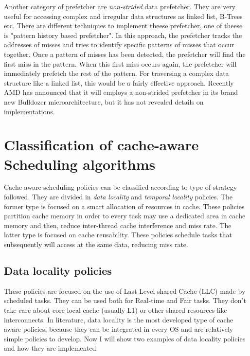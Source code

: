Another category of prefetcher are \textit{non-strided} data prefetcher. They are very useful for accessing complex and irregular data structures as 
linked list, B-Trees etc. There are different techniques to implement theese prefetcher, one of theese is "pattern history based prefetcher". 
In this approach, the prefetcher tracks the addresses of misses and tries to identify specific patterns of misses that occur together. 
Once a pattern of misses has been detected, the prefetcher will find the first miss in the pattern. When this first miss occurs again, the prefetcher 
will immediately prefetch the rest of the pattern. For traversing a complex data structure like a linked list, this would be a fairly effective approach.
Recently AMD has announced that it will employs a non-strided prefetcher in its brand new Bulldozer microarchitecture, but it has not revealed details on 
implementations.

\section{Classification of cache-aware Scheduling algorithms}

Cache aware scheduling policies can be classified according to type of strategy followed. They are divided in \textit{data locality} and 
\textit{temporal locality} policies. The former type is focused on a smart allocation of resources in cache. These policies partition cache memory in order
to every task may use a dedicated area in cache memory and then, reduce inter-thread cache interference and miss rate.
The latter type is focused on cache reusability. These policies schedule tasks that subsequently will access at the same data, reducing miss rate.

\subsection{Data locality policies} 

These policies are focused on the use of Last Level shared Cache (LLC) made by scheduled tasks. They can be used both for Real-time and Fair tasks. 
They don't take care about core-local cache (usually L1) or other shared resources like interconnects. In literature, data locality is the most developed 
type of cache aware policies, because they can be integrated in every OS and are relatively simple policies to develop. Now I will show two examples of 
data locality policies and how they are implemented.

